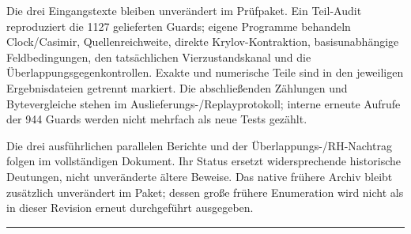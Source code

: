 Die drei Eingangstexte bleiben unverändert im Prüfpaket. Ein Teil-Audit
reproduziert die 1127 gelieferten Guards; eigene Programme behandeln
Clock/Casimir, Quellenreichweite, direkte Krylov-Kontraktion,
basisunabhängige Feldbedingungen, den tatsächlichen Vierzustandskanal
und die Überlappungsgegenkontrollen. Exakte und numerische Teile sind in
den jeweiligen Ergebnisdateien getrennt markiert. Die abschließenden
Zählungen und Bytevergleiche stehen im Auslieferungs-/Replayprotokoll;
interne erneute Aufrufe der 944 Guards werden nicht mehrfach als neue
Tests gezählt.

Die drei ausführlichen parallelen Berichte und der
Überlappungs-/RH-Nachtrag folgen im vollständigen Dokument. Ihr Status
ersetzt widersprechende historische Deutungen, nicht unveränderte ältere
Beweise. Das native frühere Archiv bleibt zusätzlich unverändert im
Paket; dessen große frühere Enumeration wird nicht als in dieser
Revision erneut durchgeführt ausgegeben.

\begin{center}\rule{0.5\linewidth}{0.5pt}\end{center}

